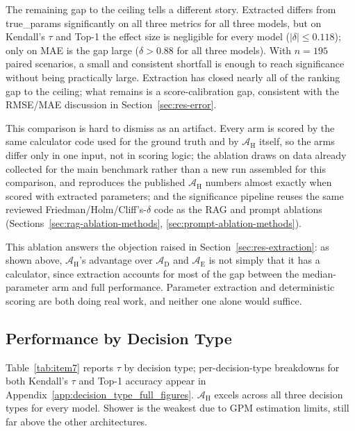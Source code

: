 \documentclass[a4paper,fleqn]{cas-dc}
\begin{document}
The remaining gap to the ceiling tells a different story. Extracted differs from true\_params significantly on all three metrics for all three models, but on Kendall's $\tau$ and Top-1 the effect size is negligible for every model ($|\delta| \leq 0.118$); only on MAE is the gap large ($\delta > 0.88$ for all three models). With $n=195$ paired scenarios, a small and consistent shortfall is enough to reach significance without being practically large. Extraction has closed nearly all of the ranking gap to the ceiling; what remains is a score-calibration gap, consistent with the RMSE/MAE discussion in Section~\ref{sec:res-error}.

This comparison is hard to dismiss as an artifact. Every arm is scored by the same calculator code used for the ground truth and by $\mathcal{A}_{\text{H}}$ itself, so the arms differ only in one input, not in scoring logic; the ablation draws on data already collected for the main benchmark rather than a new run assembled for this comparison, and reproduces the published $\mathcal{A}_{\text{H}}$ numbers almost exactly when scored with extracted parameters; and the significance pipeline reuses the same reviewed Friedman/Holm/Cliff's-$\delta$ code as the RAG and prompt ablations (Sections~\ref{sec:rag-ablation-methods}, \ref{sec:prompt-ablation-methods}).

This ablation answers the objection raised in Section~\ref{sec:res-extraction}: as shown above, $\mathcal{A}_{\text{H}}$'s advantage over $\mathcal{A}_{\text{D}}$ and $\mathcal{A}_{\text{E}}$ is not simply that it has a calculator, since extraction accounts for most of the gap between the median-parameter arm and full performance. Parameter extraction and deterministic scoring are both doing real work, and neither one alone would suffice.

\FloatBarrier
\subsection{Performance by Decision Type}
\label{sec:res-bytype}
Table~\ref{tab:item7} reports $\tau$ by decision type; per-decision-type breakdowns for both Kendall's $\tau$ and Top-1 accuracy appear in Appendix~\ref{app:decision_type_full_figures}. $\mathcal{A}_{\text{H}}$ excels across all three decision types for every model. Shower is the weakest due to GPM estimation limits, still far above the other architectures.
\end{document}
